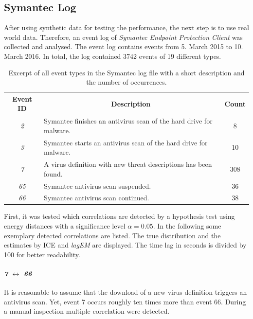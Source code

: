 \documentclass[conference]{IEEEtran}
\theoremstyle{examplestyle}
\begin{document}
\subsection{Symantec Log}
\label{sec:symantecLog}

After using synthetic data for testing the performance, the next step is to use real world data. Therefore, an event log of \textit{Symantec Endpoint Protection Client} was collected and analysed. The event log contains events from 5. March 2015 to 10. March 2016. In total, the log contained 3742 events of 19 different types.

\begin{table}[!ht]
	\centering
	\begin{tabular}{c p{} c}
		\textbf{Event ID} & \multicolumn{1}{c}{\textbf{Description}} & \textbf{Count} \\
		\hline
		\textit{2}	& Symantec finishes an antivirus scan of the hard drive for malware. & 8 \\
		\textit{3}	& Symantec starts an antivirus scan of the hard drive for malware. & 10 \\
		\textit{7}	& A virus definition with new threat descriptions has been found. & 308 \\
		\textit{65}	& Symantec antivirus scan suspended. & 36 \\
		\textit{66}	& Symantec antivirus scan continued. & 38 \\
	\end{tabular}
	\caption{Excerpt of all event types in the Symantec log file with a short description and the number of occurrences.}
	\label{tbl:symantecEvents}
\end{table}


First, it was tested which correlations are detected by a hypothesis test using energy distances with a significance level \(\alpha = 0.05\). In the following some exemplary detected correlations are listed. The true distribution and the estimates by \ac{ICE} and \textit{lagEM} are displayed. The time lag in seconds is divided by 100 for better readability.


\paragraph{\textit{7} \(\leftrightarrow\) \textit{66}} It is reasonable to assume that the download of a new virus definition triggers an antivirus scan. Yet, event 7 occurs roughly ten times more than event 66. During a manual inspection multiple correlation were detected.
\end{document}
